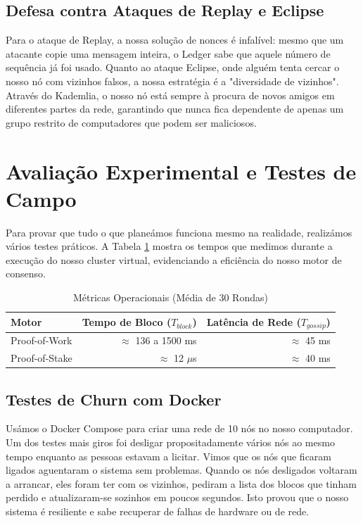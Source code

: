 \documentclass[11pt]{article}
\begin{document}
\subsection{Defesa contra Ataques de Replay e Eclipse}
Para o ataque de Replay, a nossa solução de nonces é infalível: mesmo que um atacante copie uma mensagem inteira, o Ledger sabe que aquele número de sequência já foi usado. Quanto ao ataque Eclipse, onde alguém tenta cercar o nosso nó com vizinhos falsos, a nossa estratégia é a "diversidade de vizinhos". Através do Kademlia, o nosso nó está sempre à procura de novos amigos em diferentes partes da rede, garantindo que nunca fica dependente de apenas um grupo restrito de computadores que podem ser maliciosos.

\section{Avaliação Experimental e Testes de Campo}

Para provar que tudo o que planeámos funciona mesmo na realidade, realizámos vários testes práticos. A Tabela \ref{tab:performance} mostra os tempos que medimos durante a execução do nosso cluster virtual, evidenciando a eficiência do nosso motor de consenso.

\begin{table}[H]
\centering
\caption{Métricas Operacionais (Média de 30 Rondas)}
\label{tab:performance}
\begin{tabular}{@{}lrr@{}}
\toprule
\textbf{Motor} & \textbf{Tempo de Bloco ($T_{block}$)} & \textbf{Latência de Rede ($T_{gossip}$)} \\ 
\midrule
Proof-of-Work & $\approx$ 136 a 1500 ms & $\approx$ 45 ms \\
Proof-of-Stake & $\approx$ 12 $\mu$s & $\approx$ 40 ms \\
\bottomrule
\end{tabular}
\end{table}

\subsection{Testes de Churn com Docker}
Usámos o Docker Compose para criar uma rede de 10 nós no nosso computador. Um dos testes mais giros foi desligar propositadamente vários nós ao mesmo tempo enquanto as pessoas estavam a licitar. Vimos que os nós que ficaram ligados aguentaram o sistema sem problemas. Quando os nós desligados voltaram a arrancar, eles foram ter com os vizinhos, pediram a lista dos blocos que tinham perdido e atualizaram-se sozinhos em poucos segundos. Isto provou que o nosso sistema é resiliente e sabe recuperar de falhas de hardware ou de rede.
\end{document}
